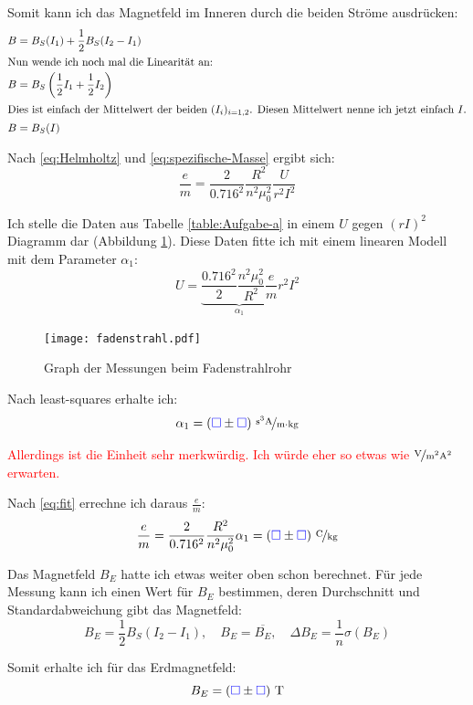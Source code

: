 \documentclass[11pt]{article}
\newcommand{\emesswert}{\left(\messwert \pm \messwert \right)}
\newcommand{\half}{\frac{1}{2}}
\newcommand{\messwert}{\textcolor{blue}{\square}}
\begin{document}
Somit kann ich das Magnetfeld im Inneren durch die beiden Ströme ausdrücken:
\begin{align*}
	B &= B_S(I_1) + \half B_S(I_2 - I_1) \\
	\intertext{Nun wende ich noch mal die Linearität an:}
	B &= B_S \left( \half I_1 + \half I_2 \right) \\
	\intertext{Dies ist einfach der Mittelwert der beiden $(I_i)_{i = 1,2}$.
	Diesen Mittelwert nenne ich jetzt einfach $I$.}
	B &= B_S(I)
\end{align*}

Nach \eqref{eq:Helmholtz} und \eqref{eq:spezifische-Masse} ergibt sich:
\begin{equation}
	\label{eq:fit}
	\frac em = \frac{2}{0.716^2} \frac{R^2}{n^2 \mu_0^2} \frac{U}{r^2 I^2}
\end{equation}

Ich stelle die Daten aus Tabelle \ref{table:Aufgabe-a} in einem $U$ gegen
$(rI)^2$ Diagramm dar (Abbildung \ref{fig:graph-fadenstrahlrohr}). Diese Daten
fitte ich mit einem linearen Modell mit dem Parameter $\alpha_1$:
\[ U = \underbrace{\frac{0.716^2}{2} \frac{n^2 \mu_0^2}{R^2} \frac em}_{\alpha_1} r^2 I^2 \]

\begin{figure}[h!]
	\centering
	\texttt{[image: fadenstrahl.pdf]}
	\caption{Graph der Messungen beim Fadenstrahlrohr}
	\label{fig:graph-fadenstrahlrohr}
\end{figure}

Nach least-squares erhalte ich:
\[ \alpha_1 = \unitfrac[\emesswert]{s^3 A}{m \cdot kg} \]

\textcolor{red}{Allerdings ist die Einheit sehr merkwürdig. Ich würde eher so
etwas wie $\unitfrac{V}{m^2 A^2}$ erwarten.}

Nach \eqref{eq:fit} errechne ich daraus $\frac em$:
\begin{equation}
	\label{eq:em}
	\frac em
	= \frac{2}{0.716^2} \frac{R^2}{n^2 \mu_0^2} \alpha_1
	= \unitfrac[\emesswert] C{kg}
\end{equation}

Das Magnetfeld $B_E$ hatte ich etwas weiter oben schon berechnet. Für jede
Messung kann ich einen Wert für $B_E$ bestimmen, deren Durchschnitt und
Standardabweichung gibt das Magnetfeld:
\[
	B_E = \half B_S(I_2 - I_1)
	, \quad
	B_E = \overline{B_E}
	, \quad
	\Delta B_E = \frac 1n \sigma(B_E)
\]

Somit erhalte ich für das Erdmagnetfeld:
\[ B_E = \unit[\emesswert] T \]
\end{document}
